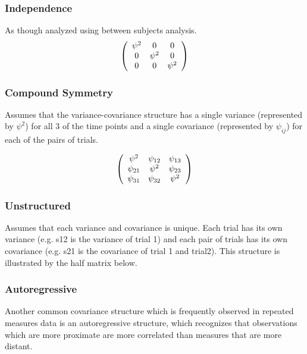 \documentclass[12pt, a4paper]{report}
\theoremstyle{plain}
\theoremstyle{definition}
\theoremstyle{remark}
\begin{document}
\subsubsection{Independence}

As though analyzed using between subjects analysis.
\[
\left(
\begin{array}{c c c}
\psi^2 & 0 & 0   \\
0 & \psi^2 & 0   \\
0 & 0 & \psi^2   \\
\end{array}%
\right)
\]



\subsubsection{Compound Symmetry}

Assumes that the variance-covariance structure has a single variance (represented by $\psi^2$)
for all 3 of the time points and a single covariance (represented by $\psi_{ij}$) for each of the pairs of trials.

\[
\left(%
\begin{array}{c c c}
\psi^2 &  \psi_{12} & \psi_{13}   \\
\psi_{21} & \psi^2 & \psi_{23}   \\
\psi_{31} & \psi_{32} & \psi^2   \\
\end{array}%
\right)
\]


\subsubsection{Unstructured}

Assumes that each variance and covariance is unique.
Each trial has its own variance (e.g. s12 is the variance of trial 1)
and each pair of trials has its own covariance (e.g. s21 is the covariance of trial 1 and trial2).
This structure is illustrated by the half matrix below.



\subsubsection{Autoregressive}

Another common covariance structure which is frequently observed
in repeated measures data is an autoregressive structure,
which recognizes that observations which are more proximate
are more correlated than measures that are more distant.
\end{document}
